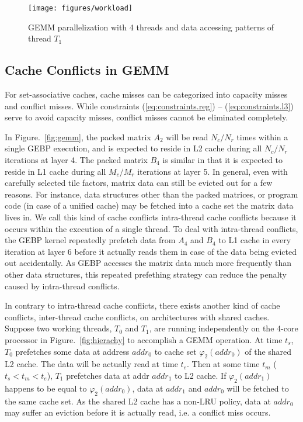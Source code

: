 \begin{figure}[t]
  \centering
  \texttt{[image: figures/workload]}
  \caption{GEMM parallelization with 4 threads and data accessing patterns of thread $T_1$}
  \label{fig:workload}
\end{figure}

\subsection{Cache Conflicts in GEMM}\label{subsec:cache-conflicts}

For set-associative caches, cache misses can be categorized
into capacity misses and conflict misses.
While constraints (\ref{eq:constraints.reg}) -- (\ref{eq:constraints.l3})
serve to avoid capacity misses,
conflict misses cannot be eliminated completely.

In Figure.~\ref{fig:gemm}, the packed matrix $A_2$
will be read $N_c/N_r$ times within a single GEBP execution,
and is expected to reside in L2 cache during all $N_c/N_r$ iterations at layer 4.
The packed matrix $B_4$ is similar in that it is expected to
reside in L1 cache during all $M_c/M_r$ iterations at layer 5.
In general, even with carefully selected tile factors,
matrix data can still be evicted out for a few reasons.
For instance, data structures other than the packed matrices,
or program code (in case of a unified cache) may be fetched into a
cache set the matrix data lives in.
We call this kind of cache conflicts intra-thread cache conflicts
because it occurs within the execution of a single thread.
To deal with intra-thread conflicts,
the GEBP kernel repeatedly prefetch data from $A_4$ and $B_4$ to L1 cache
in every iteration at layer 6 before it actually reads them in case of
the data being evicted out accidentally.
As GEBP accesses the matrix data much more frequently than other
data structures, this repeated prefething strategy
can reduce the penalty caused by intra-thread conflicts.

In contrary to intra-thread cache conflicts,
there exists another kind of cache conflicts,
inter-thread cache conflicts, on architectures with shared caches.
Suppose two working threads, $T_0$ and $T_1$, are running independently
on the 4-core processor in Figure.~\ref{fig:hierachy}
to accomplish a GEMM operation.
At time $t_s$, $T_0$ prefetches some data at address $addr_0$
to cache set $\varphi_2(addr_0)$ of the shared L2 cache.
The data will be actually read at time $t_e$.
Then at some time $t_m$ ($t_s < t_m < t_e$),
$T_1$ prefetches data at addr $addr_1$ to L2 cache.
If $\varphi_2(addr_1)$ happens to be equal to $\varphi_2(addr_0)$,
data at $addr_1$ and $addr_0$ will be fetched to the same cache set.
As the shared L2 cache has a non-LRU policy,
data at $addr_0$ may suffer an eviction before it is actually read,
i.e. a conflict miss occurs.

